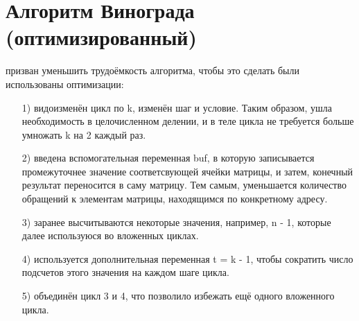 \section{Алгоритм Винограда (оптимизированный)}
 призван уменьшить трудоёмкость алгоритма, чтобы это сделать были использованы оптимизации:
\begin{enumerate}
	\item[1)]видоизменён цикл по k, изменён шаг и условие. Таким образом, ушла необходимость в целочисленном делении, и в теле цикла не требуется больше умножать k на 2 каждый раз.
	\item[2)]введена вспомогательная переменная buf, в которую записывается промежуточнее значение соответсвующей ячейки матрицы, и затем, конечный результат переносится в саму матрицу. Тем самым, уменьшается количество обращений к элементам матрицы, находящимся по конкретному адресу.
	\item[3)]заранее высчитываются некоторые значения, например, n - 1, которые далее используюся во вложенных циклах.
	\item[4)]используется дополнительная переменная t = k - 1, чтобы сократить число подсчетов этого значения на каждом шаге цикла. 
	\item[5)]объединён цикл 3 и 4, что позволило избежать ещё одного вложенного цикла.
\end{enumerate}

